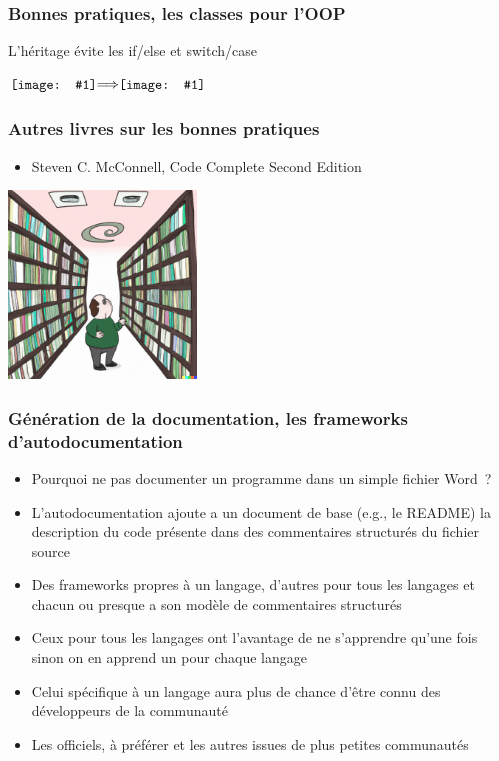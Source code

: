\documentclass{beamer}
\newcommand*{\vcenterimage}[1]{\vcenter{\hbox{\texttt{[image: \#1]}}}}
\newcommand*{\vcenterarrow}{\vcenter{\hbox{$\Longrightarrow$}}}
\begin{document}
    \begin{frame}
        \transdissolve
        \frametitle{Bonnes pratiques, les classes pour l'OOP}

        L'héritage évite les if/else et switch/case

        \centering

        $\vcenterimage{image/if-else.png}\vcenterarrow\vcenterimage{image/inheritance-bird.png}$

    \end{frame}

    \begin{frame}
        \transdissolve
        \frametitle{Autres livres sur les bonnes pratiques}

        \begin{itemize}

            \item Steven C. McConnell, Code Complete Second Edition
        \end{itemize}
        \bigbreak

        \centering
        \includegraphics[width=5cm]{image/an-inifinity-of-books.png}

    \end{frame}

    \begin{frame}
        \transdissolve
        \frametitle{Génération de la documentation, les frameworks d'autodocumentation}

        \begin{itemize}

            \item Pourquoi ne pas documenter un programme dans un simple fichier Word~?
            \item L'autodocumentation ajoute a un document de base (e.g., le README) la description du code présente dans des commentaires structurés du fichier source
            \item Des frameworks propres à un langage, d'autres pour tous les langages et chacun ou presque a son modèle de commentaires structurés
            \item Ceux pour tous les langages ont l'avantage de ne s'apprendre qu'une fois sinon on en apprend un pour chaque langage
            \item Celui spécifique à un langage aura plus de chance d'être connu des développeurs de la communauté
            \item Les officiels, à préférer et les autres issues de plus petites communautés
        \end{itemize}

    \end{frame}
\end{document}
